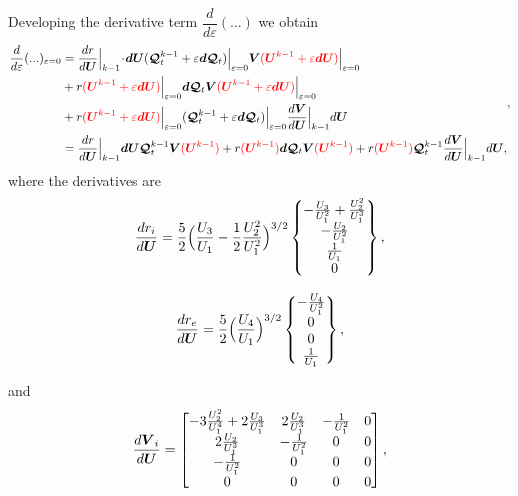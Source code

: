 \documentclass[a4paper,10pt]{article}
\newcommand{\bm}[1]{\text{\boldmath$#1$\unboldmath}}
\newcommand{\scal}{\! \cdot \! }
\newcommand{\DiscFunc}[1]{\bm{#1}}
\newcommand{\SecOrdTens}[1]{\bm{\mathcal{#1}}}
\renewcommand{\u}{\DiscFunc{U}}
\newcommand{\G}{\SecOrdTens{Q}}
\newcommand{\Gt}{\G_t}
\newcommand{\fo}[1]{{ \color{red} ( #1 )\color{black} }} %
\begin{document}
Developing the derivative term $\dfrac{d}{d\varepsilon}(...)$ we obtain
\begin{equation}\label{eq:linear-ft-1}
 \begin{split}
 \dfrac{d}{d\varepsilon}(...)_{\varepsilon=0} &= 
 \dfrac{dr}{d\u}\Big|_{k-1}\scal \bm{dU}(\Gt^{k-1}+\varepsilon \bm{d}\Gt)\Big|_{\varepsilon=0}\bm{V}\fo{\u^{k-1}+\varepsilon\bm{dU}}\Big|_{\varepsilon=0} \\
 &+ r\fo{\u^{k-1}+\varepsilon\bm{dU}}\Big|_{\varepsilon=0}\bm{d}\Gt\bm{V}\fo{\u^{k-1}+\varepsilon\bm{dU}}\Big|_{\varepsilon=0}\\
 &+ r\fo{\u^{k-1}+\varepsilon\bm{dU}}\Big|_{\varepsilon=0}(\Gt^{k-1}+\varepsilon \bm{d}\Gt)\Big|_{\varepsilon=0}\dfrac{d\bm{V}}{d\u}\Big|_{k-1}d\u \\
 &=\dfrac{dr}{d\u}\Big|_{k-1} \bm{dU}\Gt^{k-1}\bm{V}\fo{\u^{k-1}}+r\fo{\u^{k-1}}\bm{d}\Gt\bm{V}\fo{\u^{k-1}}+r\fo{\u^{k-1}}\Gt^{k-1}\dfrac{d\bm{V}}{d\u}\Big|_{k-1}d\u,
 \end{split},
\end{equation}
where the derivatives are
\begin{equation*}
 \dfrac{dr_i}{d\u} = \dfrac{5}{2}\Big( \dfrac{U_3}{U_1}-\dfrac{1}{2}\dfrac{U_2^2}{U_1^2}\Big)^{3/2}
 \begin{Bmatrix}
  -\frac{U_3}{U_1^2}+\frac{U_2^2}{U_1^3}\\
  -\frac{U_2}{U_1^2}\\
  \frac{1}{U_1}\\
  0
 \end{Bmatrix},
\end{equation*}

\begin{equation*}
 \dfrac{dr_e}{d\u} = \dfrac{5}{2}\Big( \dfrac{U_4}{U_1} \Big)^{3/2}
 \begin{Bmatrix}
  -\frac{U_4}{U_1^2}\\
  0\\
  0\\
  \frac{1}{U_1}
 \end{Bmatrix},
\end{equation*}

and 
\begin{equation*}
 \dfrac{d\bm{V}_i}{d\u} = \begin{bmatrix}
       -3 \frac {U_2^2}{U_1^4}+2\frac {U_3}{U_1^3} &   2\frac{U_2}{U_1^3}   & -\frac{1}{U_1^2} & 0 \\
                           2\frac{U_2}{U_1^3}            &    -\frac{1}{U_1^2}    &        0   & 0 \\
                            -\frac{1}{U_1^2}             &          0             &        0   & 0 \\
                            0                            &          0             &        0   & 0 \\
                        \end{bmatrix},
\end{equation*}
\end{document}

